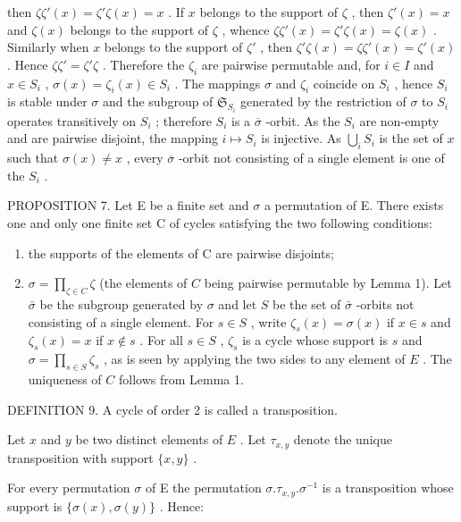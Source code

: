 then \(\zeta\zeta'(x) = \zeta'\zeta(x) = x\) . If \(x\) belongs to the support of \(\zeta\) , then \(\zeta'(x) = x\) and \(\zeta(x)\) belongs to the support of \(\zeta\) , whence \(\zeta\zeta'(x) = \zeta'\zeta(x) = \zeta(x)\) . Similarly when \(x\) belongs to the support of \(\zeta'\) , then \(\zeta'\zeta(x) = \zeta\zeta'(x) = \zeta'(x)\) . Hence \(\zeta\zeta' = \zeta'\zeta\) . Therefore the \(\zeta_i\) are pairwise permutable and, for \(i \in I\) and \(x \in S_i\) , \(\sigma(x) = \zeta_i(x) \in S_i\) . The mappings \(\sigma\) and \(\zeta_i\) coincide on \(S_i\) , hence \(S_i\) is stable under \(\sigma\) and the subgroup of \(\mathfrak{S}_{S_i}\) generated by the restriction of \(\sigma\) to \(S_i\) operates transitively on \(S_i\) ; therefore \(S_i\) is a \(\overline{\sigma}\) -orbit. As the \(S_i\) are non-empty and are pairwise disjoint, the mapping \(i \mapsto S_i\) is injective. As \(\bigcup_{i} S_i\) is the set of \(x\) such that \(\sigma(x) \neq x\) , every \(\overline{\sigma}\) -orbit not consisting of a single element is one of the \(S_i\) .

PROPOSITION 7. Let E be a finite set and \(\sigma\) a permutation of E. There exists one and only one finite set C of cycles satisfying the two following conditions:

\begin{enumerate}
\def\labelenumi{(\alph{enumi})}
\item
  the supports of the elements of C are pairwise disjoints;
\item
  \(\sigma = \prod_{\zeta \in C} \zeta\) (the elements of \(C\) being pairwise permutable by Lemma 1). Let \(\bar{\sigma}\) be the subgroup generated by \(\sigma\) and let \(S\) be the set of \(\bar{\sigma}\) -orbits not consisting of a single element. For \(s \in S\) , write \(\zeta_s(x) = \sigma(x)\) if \(x \in s\) and \(\zeta_s(x) = x\) if \(x \notin s\) . For all \(s \in S\) , \(\zeta_s\) is a cycle whose support is \(s\) and \(\sigma = \prod_{s \in S} \zeta_s\) , as is seen by applying the two sides to any element of \(E\) . The uniqueness of \(C\) follows from Lemma 1.
\end{enumerate}

DEFINITION 9. A cycle of order 2 is called a transposition.

Let \(x\) and \(y\) be two distinct elements of \(E\) . Let \(\tau_{x,y}\) denote the unique transposition with support \(\{x, y\}\) .

For every permutation \(\sigma\) of E the permutation \(\sigma. \tau_{x,y}. \sigma^{-1}\) is a transposition whose support is \(\{\sigma(x), \sigma(y)\}\) . Hence:

